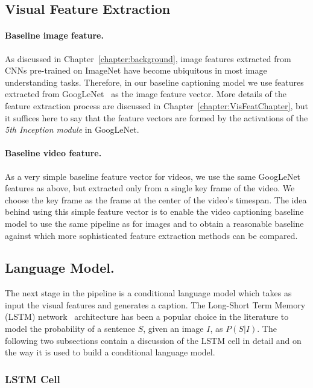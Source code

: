 \subsection{Visual Feature Extraction}

\paragraph{Baseline image feature.} As discussed in
Chapter~\ref{chapter:background}, image features extracted from CNNs pre-trained
on ImageNet have become ubiquitous in most image understanding tasks.
Therefore, in our baseline captioning model we use features extracted from
GoogLeNet~\cite{DBLP:journals/corr/SzegedyLJSRAEVR14} as the image feature
vector.
More details of the feature extraction process are discussed in
Chapter~\ref{chapter:VisFeatChapter}, but it suffices here to say that the feature
vectors are formed by the activations of the \emph{5th Inception module} in
GoogLeNet.

\paragraph{Baseline video feature.} As a very simple baseline feature vector for
videos, we use the same GoogLeNet features as above, but extracted only from a
single key frame of the video.
We choose the key frame as the frame at the center of the video's timespan.
The idea behind using this simple feature vector is to enable the video
captioning baseline model to use the same pipeline as for images and to obtain a
reasonable baseline against which more sophisticated feature extraction methods
can be compared.

\subsection{Language Model.}

The next stage in the pipeline is a conditional language model which
takes as input the visual features and generates a caption.
The Long-Short Term Memory (LSTM) network~\cite{Hochreiter1997} architecture has
been a popular choice in the literature to model the probability of a sentence
$S$, given an image $I$, as $P(S|I)$.
The following two subsections contain a discussion of the LSTM cell in detail
and on the way it is used to build a conditional language model.

\subsubsection{LSTM Cell}

